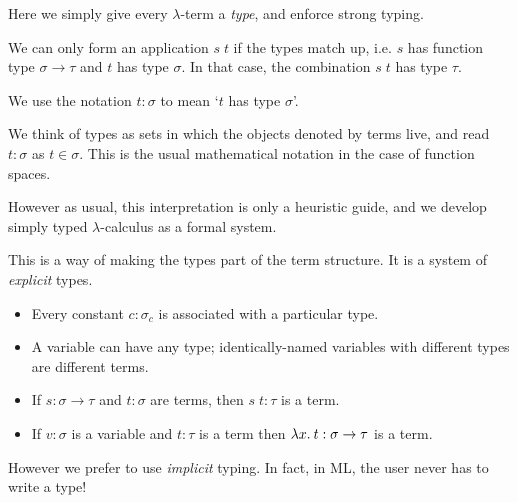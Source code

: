 \begin{slide*}


\vspace*{0.5cm}

Here we simply give every $\lambda$-term a {\em type}, and enforce
strong typing.

We can only form an application {\red $s\; t$} if the types match up, i.e.
{\red $s$} has function type {\red $\sigma \to \tau$} and {\red $t$} has type
{\red $\sigma$}. In that case, the combination {\red $s\; t$} has type {\red
$\tau$}.

We use the notation {\red $t:\sigma$} to mean `{\red $t$} has type {\red
$\sigma$}'.

We think of types as sets in which the objects denoted by terms live, and read
{\red $t:\sigma$} as {\red $t \in \sigma$}. This is the usual mathematical
notation in the case of function spaces.

However as usual, this interpretation is only a heuristic guide, and we develop
simply typed $\lambda$-calculus as a formal system.

\end{slide*}



\begin{slide*}


\vspace*{0.5cm}

This is a way of making the types part of the term structure. It is a system of
{\em explicit} types.

\begin{itemize}

\item Every constant {\red $c:\sigma_c$} is associated with a particular type.

\item A variable can have any type; identically-named variables with different
types are different terms.

\item If {\red $s:\sigma \to \tau$} and {\red $t:\sigma$} are terms, then
{\red $s\; t : \tau$} is a term.

\item If {\red $v:\sigma$} is a variable and {\red $t:\tau$} is a term then
{\red $\lambda x.\: t : \sigma \to \tau$} is a term.

\end{itemize}

However we prefer to use {\em implicit} typing. In fact, in ML, the user never
has to write a type!

\end{slide*}



